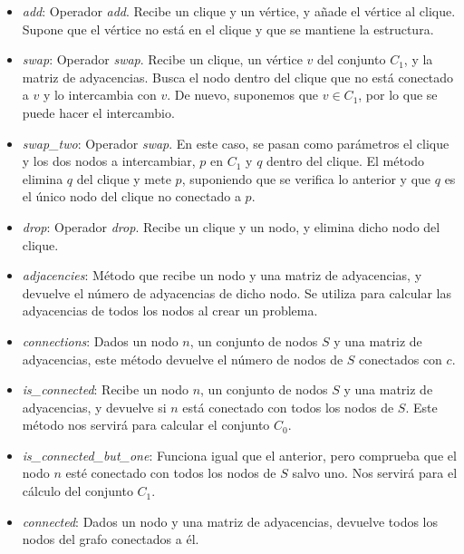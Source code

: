 \begin{itemize}
  \item \textit{add}: Operador \textit{add}. Recibe un clique y un vértice, y añade
        el vértice al clique. Supone que el vértice no está en el clique y que
        se mantiene la estructura.

  \item \textit{swap}: Operador \textit{swap}. Recibe un clique, un vértice $v$ del conjunto
        $C_1$, y la matriz de adyacencias. Busca el nodo dentro del clique que no está
        conectado a $v$ y lo intercambia con $v$. De nuevo, suponemos que $v \in C_1$,
        por lo que se puede hacer el intercambio.

  \item \textit{swap\_two}: Operador \textit{swap}. En este caso, se pasan como parámetros
        el clique y los dos nodos a intercambiar, $p$ en $C_1$ y $q$ dentro del clique.
        El método elimina $q$ del clique y mete $p$, suponiendo que se verifica lo
        anterior y que $q$ es el único nodo del clique no conectado a $p$.

  \item \textit{drop}: Operador \textit{drop}. Recibe un clique y un nodo, y elimina
        dicho nodo del clique.

  \item \textit{adjacencies}: Método que recibe un nodo y una matriz de adyacencias,
        y devuelve el número de adyacencias de dicho nodo. Se utiliza para calcular
        las adyacencias de todos los nodos al crear un problema.

  \item \textit{connections}: Dados un nodo $n$, un conjunto de nodos $S$ y una matriz de
        adyacencias, este método devuelve el número de nodos de $S$ conectados con $c$.

  \item \textit{is\_connected}: Recibe un nodo $n$, un conjunto de nodos $S$ y una matriz
        de adyacencias, y devuelve si $n$ está conectado con todos los nodos de $S$.
        Este método nos servirá para calcular el conjunto $C_0$.

  \item \textit{is\_connected\_but\_one}: Funciona igual que el anterior, pero comprueba
        que el nodo $n$ esté conectado con todos los nodos de $S$ salvo uno. Nos servirá
        para el cálculo del conjunto $C_1$.

  \item \textit{connected}: Dados un nodo y una matriz de adyacencias, devuelve todos los
        nodos del grafo conectados a él.


\end{itemize}
